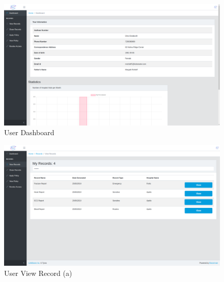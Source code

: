 \begin{figure}[!h]
	\centering
	\includegraphics[width=\linewidth]{Images/User/UserDashboard.png}
	\caption{User Dashboard}
\end{figure}
\begin{figure}[!b]
	\centering
	\includegraphics[width=\linewidth]{Images/User/UserViewRecord1.png}
	\caption{ User View Record (a)}
\end{figure}

